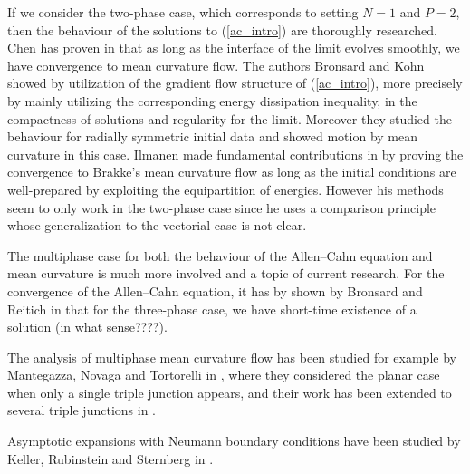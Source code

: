 If we consider the two-phase case, which corresponds to setting $ N = 1 $ and $ 
P = 2 $, then 
the behaviour of the solutions to (\ref{ac_intro}) are thoroughly researched.
Chen has proven in 
\cite{chen_generation_and_propagation_of_interfaces_for_reaction_diffusion_equations}
that as long as the interface of the limit evolves smoothly, we have 
convergence to mean curvature flow.
The authors Bronsard and Kohn showed by utilization of the gradient flow 
structure of (\ref{ac_intro}), more precisely by mainly utilizing the 
corresponding energy dissipation inequality, in 
\cite{bronsard_kohn_motion_by_mean_curvature_as_singular_limit} the compactness 
of solutions and regularity for the limit. Moreover they studied the behaviour 
for radially symmetric initial data and showed motion by mean curvature in this 
case. 
Ilmanen made fundamental contributions in 
\cite{ilmanen_convergence_of_ac_to_brakkes_mcf} by proving the convergence to 
Brakke's mean curvature flow as long as the initial conditions are 
well-prepared by exploiting the equipartition of energies. However his methods 
seem to only work in the two-phase case since he uses a comparison principle 
whose generalization to the vectorial case is not clear.

The multiphase case for both the behaviour of the Allen--Cahn equation and mean 
curvature is much more involved and a topic of current research. For the 
convergence of the Allen--Cahn equation, it has by shown by Bronsard and 
Reitich in 
\cite{bronsard_reitich_on_three_phase_boundary_motion_and_singular_limit} that 
for the three-phase case, we have short-time existence of a solution (in what 
sense????). 

The analysis of multiphase mean curvature flow has been studied for example by 
Mantegazza, Novaga and Tortorelli in 
\cite{mantegazza_novaga_tortorelli_motion_by_curvature_of_planar_networks}, 
where they considered the planar case when only a single triple junction 
appears, and their work has been extended to several triple junctions in 
\cite{mantegazza_novaga_pluda_schule_evolution_of_networks_with_multiple_junctions}.

Asymptotic expansions  with Neumann boundary conditions 
have been studied by Keller, Rubinstein and Sternberg in 
\cite{keller_rubinstein_sternberg_fast_reaction_slow_diffusion}.
